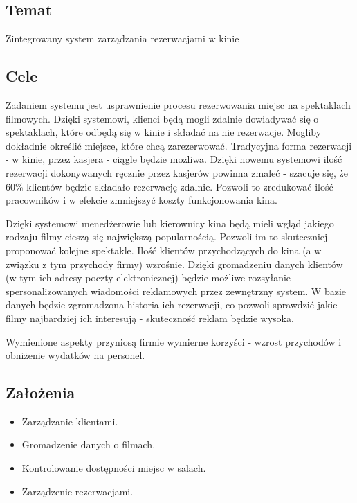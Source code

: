 \subsection*{Temat}
Zintegrowany system zarządzania rezerwacjami w kinie


\subsection*{Cele}

Zadaniem systemu jest usprawnienie procesu rezerwowania miejsc na spektaklach filmowych. Dzięki systemowi, klienci będą mogli zdalnie dowiadywać się o spektaklach, które odbędą się w kinie i składać na nie rezerwacje. Mogliby dokładnie określić miejsce, które chcą zarezerwować. Tradycyjna forma rezerwacji - w kinie, przez kasjera - ciągle będzie możliwa. Dzięki nowemu systemowi ilość rezerwacji dokonywanych ręcznie przez kasjerów powinna zmaleć - szacuje się, że 60\% klientów będzie składało rezerwację zdalnie. Pozwoli to zredukować ilość pracowników i w efekcie zmniejszyć koszty funkcjonowania kina.

Dzięki systemowi menedżerowie lub kierownicy kina będą mieli wgląd jakiego rodzaju filmy cieszą się największą popularnością. Pozwoli im to skuteczniej proponować kolejne spektakle. Ilość klientów przychodzących do kina (a w związku z tym przychody firmy) wzrośnie.
Dzięki gromadzeniu danych klientów (w tym ich adresy poczty elektronicznej) będzie możliwe rozsyłanie spersonalizowanych wiadomości reklamowych przez zewnętrzny system. W bazie danych będzie zgromadzona historia ich rezerwacji, co pozwoli sprawdzić jakie filmy najbardziej ich interesują - skuteczność reklam będzie wysoka.

Wymienione aspekty przyniosą firmie wymierne korzyści - wzrost przychodów i obniżenie wydatków na personel.


\subsection*{Założenia}

\begin{itemize}
	\item Zarządzanie klientami.
    \item Gromadzenie danych o filmach.
	\item Kontrolowanie dostępności miejsc w salach.
    \item Zarządzenie rezerwacjami.
\end{itemize}